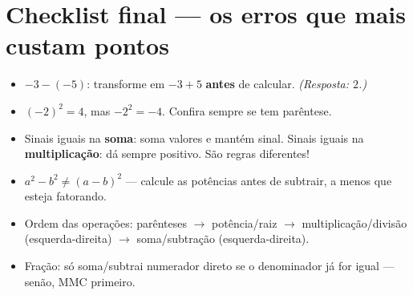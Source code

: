 \documentclass[12pt,a4paper]{article}
\begin{document}
\section*{Checklist final — os erros que mais custam pontos}
\begin{itemize}[nosep]
  \item $-3-(-5)$: transforme em $-3+5$ \textbf{antes} de calcular. \emph{(Resposta: $2$.)}
  \item $(-2)^2 = 4$, mas $-2^2=-4$. Confira sempre se tem parêntese.
  \item Sinais iguais na \textbf{soma}: soma valores e mantém sinal. Sinais iguais na \textbf{multiplicação}: dá sempre positivo. São regras diferentes!
  \item $a^2-b^2 \neq (a-b)^2$ — calcule as potências antes de subtrair, a menos que esteja fatorando.
  \item Ordem das operações: parênteses $\to$ potência/raiz $\to$ multiplicação/divisão (esquerda-direita) $\to$ soma/subtração (esquerda-direita).
  \item Fração: só soma/subtrai numerador direto se o denominador já for igual — senão, MMC primeiro.
\end{itemize}
\end{document}
